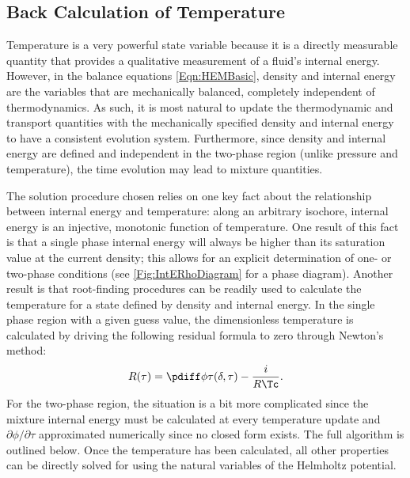 \subsection{Back Calculation of Temperature}
Temperature is a very powerful state variable because it is a directly measurable quantity that provides a qualitative measurement of a fluid's internal energy.
However, in the balance equations \cref{Eqn:HEMBasic}, density and internal energy are the variables that are mechanically balanced, completely independent of thermodynamics. 
As such, it is most natural to update the thermodynamic and transport quantities with the mechanically specified density and internal energy to have a consistent evolution system.
Furthermore, since density and internal energy are defined and independent in the two-phase region (unlike pressure and temperature), the time evolution may lead to mixture quantities.

The solution procedure chosen relies on one key fact about the relationship between internal energy and temperature: 
along an arbitrary isochore, internal energy is an injective, monotonic function of temperature.
One result of this fact is that a single phase internal energy will always be higher than its saturation value at the current density; this allows for an explicit determination of one- or two-phase conditions (see \cref{Fig:IntERhoDiagram} for a phase diagram).
Another result is that root-finding procedures can be readily used to calculate the temperature for a state defined by density and internal energy.
In the single phase region with a given guess value, the dimensionless temperature is calculated by driving the following residual formula to zero through Newton's method:
\begin{equation}
    R(\tau) = \phit(\delta,\tau) - \frac{i}{R\Tc}.
    \label{Eqn:SinglePhaseResidualForTemperature}
\end{equation}
For the two-phase region, the situation is a bit more complicated since the mixture internal energy must be calculated at every temperature update and $\partial\phi/\partial\tau$ approximated numerically since no closed form exists.
The full algorithm is outlined below.
Once the temperature has been calculated, all other properties can be directly solved for using the natural variables of the Helmholtz potential.


